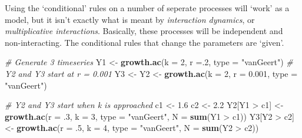 \documentclass[]{book}
\newenvironment{Shaded}{\begin{snugshade}}{\end{snugshade}}
\newcommand{\KeywordTok}[1]{\textcolor[rgb]{0.13,0.29,0.53}{\textbf{{#1}}}}
\newcommand{\DataTypeTok}[1]{\textcolor[rgb]{0.13,0.29,0.53}{{#1}}}
\newcommand{\DecValTok}[1]{\textcolor[rgb]{0.00,0.00,0.81}{{#1}}}
\newcommand{\FloatTok}[1]{\textcolor[rgb]{0.00,0.00,0.81}{{#1}}}
\newcommand{\StringTok}[1]{\textcolor[rgb]{0.31,0.60,0.02}{{#1}}}
\newcommand{\CommentTok}[1]{\textcolor[rgb]{0.56,0.35,0.01}{\textit{{#1}}}}
\newcommand{\NormalTok}[1]{{#1}}
\begin{document}
Using the `conditional' rules on a number of seperate processes will
`work' as a model, but it isn't exactly what is meant by
\emph{interaction dynamics}, or \emph{multiplicative interactions}.
Basically, these processes will be independent and non-interacting. The
conditional rules that change the parameters are `given'.

\begin{Shaded}
\begin{Highlighting}[]
\CommentTok{# Generate 3 timeseries}
\NormalTok{Y1 <-}\StringTok{ }\KeywordTok{growth.ac}\NormalTok{(}\DataTypeTok{k =} \DecValTok{2}\NormalTok{, }\DataTypeTok{r =}\NormalTok{.}\DecValTok{2}\NormalTok{, }\DataTypeTok{type =} \StringTok{"vanGeert"}\NormalTok{)}
\CommentTok{# Y2 and Y3 start at r = 0.001}
\NormalTok{Y3 <-}\StringTok{ }\NormalTok{Y2 <-}\StringTok{ }\KeywordTok{growth.ac}\NormalTok{(}\DataTypeTok{k =} \DecValTok{2}\NormalTok{, }\DataTypeTok{r =} \FloatTok{0.001}\NormalTok{, }\DataTypeTok{type =} \StringTok{"vanGeert"}\NormalTok{)}

\CommentTok{# Y2 and Y3 start when k is approached}
\NormalTok{c1 <-}\StringTok{ }\FloatTok{1.6}
\NormalTok{c2 <-}\StringTok{ }\FloatTok{2.2}
\NormalTok{Y2[Y1 >}\StringTok{ }\NormalTok{c1] <-}\StringTok{ }\KeywordTok{growth.ac}\NormalTok{(}\DataTypeTok{r =} \NormalTok{.}\DecValTok{3}\NormalTok{, }\DataTypeTok{k =} \DecValTok{3}\NormalTok{, }\DataTypeTok{type =} \StringTok{"vanGeert"}\NormalTok{, }\DataTypeTok{N =} \KeywordTok{sum}\NormalTok{(Y1 >}\StringTok{ }\NormalTok{c1))}
\NormalTok{Y3[Y2 >}\StringTok{ }\NormalTok{c2] <-}\StringTok{ }\KeywordTok{growth.ac}\NormalTok{(}\DataTypeTok{r =} \NormalTok{.}\DecValTok{5}\NormalTok{, }\DataTypeTok{k =} \DecValTok{4}\NormalTok{, }\DataTypeTok{type =} \StringTok{"vanGeert"}\NormalTok{, }\DataTypeTok{N =} \KeywordTok{sum}\NormalTok{(Y2 >}\StringTok{ }\NormalTok{c2))}


\end{Highlighting}
\end{Shaded}
\end{document}
